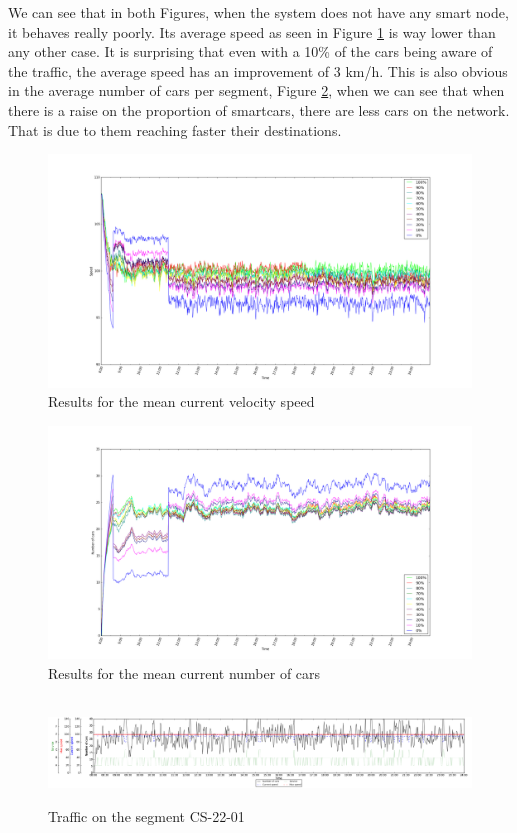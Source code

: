 We can see that in both Figures, when the system does not have any smart node, it behaves really poorly. Its average speed as seen in Figure \ref{vcurrent} is way lower than any other case. It is surprising that even with a 10\% of the cars being aware of the traffic, the average speed has an improvement of 3 km/h. This is also obvious in the average number of cars per segment, Figure \ref{numCars}, when we can see that when there is a raise on the proportion of smartcars, there are less cars on the network. That is due to them reaching faster their destinations.

\begin{figure}[!ht]
\hspace{-1.5cm}%
  \includegraphics[scale=0.3]{images/Speed.png}
  \caption{Results for the mean current velocity speed}
  \label{vcurrent}
\end{figure}

\begin{figure}[!ht]
\hspace{-1.5cm}%
  \includegraphics[scale=0.3]{images/Num_cars.png}
  \caption{Results for the mean current number of cars}
  \label{numCars}
\end{figure}

\begin{figure}[!ht]
\
  \includegraphics[scale=0.2]{images/cs2201.png}
  \caption{Traffic on the segment CS-22-01}
  \label{traffic}
\end{figure}
